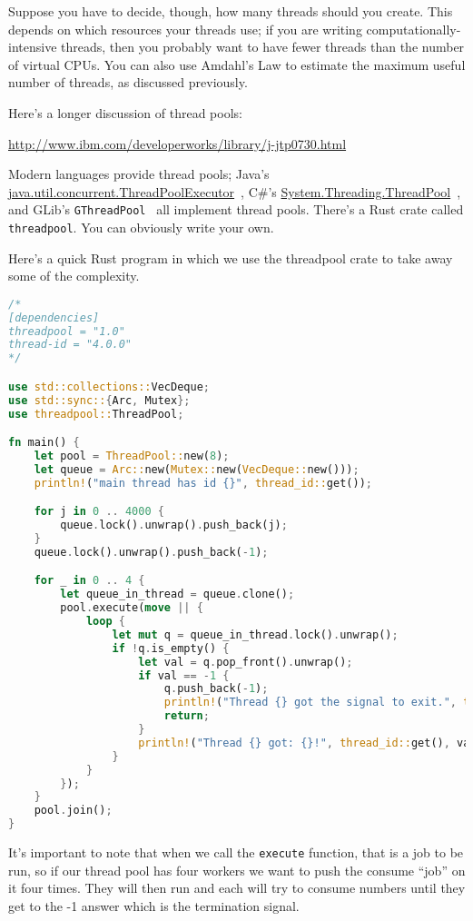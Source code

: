 Suppose you have to decide, though, how many threads should you create.
This depends
on which resources your threads use; if you are writing
computationally-intensive threads, then you probably want to have
fewer threads than the number of virtual CPUs. You can also use
Amdahl's Law to estimate the maximum useful number of threads, as
discussed previously.

Here's a longer discussion of thread pools:

\begin{center}
\url{http://www.ibm.com/developerworks/library/j-jtp0730.html}
\end{center}

Modern languages provide thread pools; Java's
\url{java.util.concurrent.ThreadPoolExecutor}~\cite{java:threadpoolexecutor}, C\#'s
\url{System.Threading.ThreadPool}~\cite{csharp:threadpool}, and GLib's {\tt GThreadPool}~\cite{gnome:threadpool} all implement thread pools. There's a Rust crate called \texttt{threadpool}. You can obviously write your own.

Here's a quick Rust program in which we use the threadpool crate to take away some of the complexity.
\begin{lstlisting}[language=Rust]
/*
[dependencies]
threadpool = "1.0"
thread-id = "4.0.0"
*/

use std::collections::VecDeque;
use std::sync::{Arc, Mutex};
use threadpool::ThreadPool;

fn main() {
    let pool = ThreadPool::new(8);
    let queue = Arc::new(Mutex::new(VecDeque::new()));
    println!("main thread has id {}", thread_id::get());

    for j in 0 .. 4000 {
        queue.lock().unwrap().push_back(j);
    }
    queue.lock().unwrap().push_back(-1);

    for _ in 0 .. 4 {
        let queue_in_thread = queue.clone();
        pool.execute(move || {
            loop {
                let mut q = queue_in_thread.lock().unwrap();
                if !q.is_empty() {
                    let val = q.pop_front().unwrap();
                    if val == -1 {
                        q.push_back(-1);
                        println!("Thread {} got the signal to exit.", thread_id::get());
                        return;
                    }
                    println!("Thread {} got: {}!", thread_id::get(), val);
                }
            }
        });
    }
    pool.join();
}
\end{lstlisting}

It's important to note that when we call the \texttt{execute} function, that is a job to be run, so if our thread pool has four workers we want to push the consume ``job'' on it four times. They will then run and each will try to consume numbers until they get to the -1 answer which is the termination signal.

